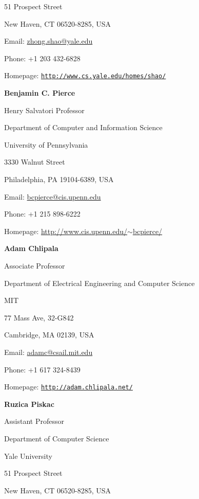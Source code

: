 \documentclass[11pt]{article}
\providecommand*\url[1]{\href{#1}{#1}}
\renewcommand*\url[1]{\href{#1}{\texttt{#1}}}
\providecommand*\email[1]{\href{mailto:#1}{#1}}
\begin{document}
51 Prospect Street

New Haven, CT 06520-8285, USA

\vspace{.05in}
Email: \email{zhong.shao@yale.edu}

Phone:  +1 203 432-6828

Homepage: \url{http://www.cs.yale.edu/homes/shao/}

\vspace{.2in}

\textbf{Benjamin C. Pierce} 

Henry Salvatori Professor

Department of Computer and Information Science 

University of Pennsylvania

3330 Walnut Street

Philadelphia, PA  19104-6389, USA
\vspace{.05in}

Email: \email{bcpierce@cis.upenn.edu}

Phone: +1 215 898-6222

Homepage: \href{http://www.cis.upenn.edu/~bcpierce/}{http://www.cis.upenn.edu/$\sim$bcpierce/}

\vspace{.2in}

\textbf{Adam Chlipala}

Associate Professor

Department of Electrical Engineering and Computer Science

MIT

77 Mass Ave, 32-G842

Cambridge, MA   02139, USA

\vspace{.05in}

Email: \email{adamc@csail.mit.edu}

Phone: +1 617 324-8439

Homepage: \url{http://adam.chlipala.net/}

\vspace{.2in}

\textbf{Ruzica Piskac}

Assistant Professor

Department of Computer Science

Yale University

51 Prospect Street

New Haven, CT 06520-8285, USA

\vspace{.05in}
\end{document}
